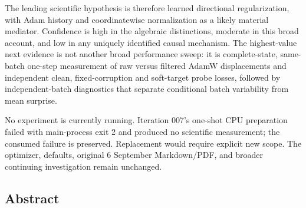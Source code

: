 \documentclass[
  british,
  10pt,
  a4paper,
]{article}
\begin{document}
The leading scientific hypothesis is therefore learned directional
regularizati\allowbreak{}on,\allowbreak{} with Adam history and
coordinatewise normalization as a likely material mediator. Confidence
is high in the algebraic distinctions\allowbreak{},\allowbreak{}
moderate in this broad account, and low in any uniquely identified
causal mechanism. The highest-\allowbreak{}value next evidence is not
another broad performance sweep: it is
complete-\allowbreak{}state,\allowbreak{} same-batch one-step
measurement of raw versus filtered AdamW displacements and independent
clean, fixed-\allowbreak{}corruption and soft-\allowbreak{}target probe
losses, followed by independent-\allowbreak{}batch diagnostics that
separate conditional batch variability from mean surprise.

No experiment is currently running. Iteration 007's one-shot CPU
preparation failed with main-\allowbreak{}process exit 2 and produced no
scientific measurement; the consumed failure is preserved. Replacement
would require explicit new scope. The optimizer, defaults, original 6
September Markdown/\allowbreak{}PDF,\allowbreak{} and broader continuing
investigation remain unchanged.

\subsection{Abstract}\label{synthesis--abstract}
\end{document}
